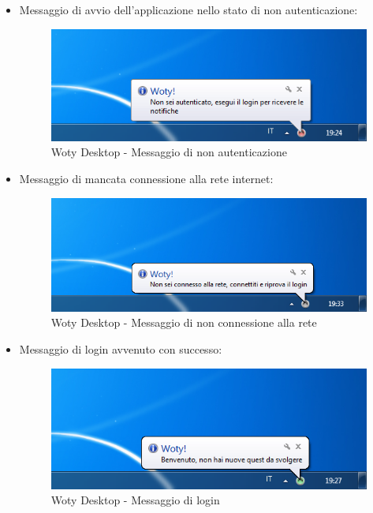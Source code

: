 \begin{itemize}
\item Messaggio di avvio dell'applicazione nello stato di non autenticazione:

\begin{center}
\begin{figure}[H]
\centering
\includegraphics[scale=0.64]{images/wotyDesktop/schreenshots/msg-start.png}
\caption{Woty Desktop - Messaggio di non autenticazione}
\label{wd}
\end{figure}
\end{center}

\item Messaggio di mancata connessione alla rete internet:

\begin{center}
\begin{figure}[H]
\centering
\includegraphics[scale=0.6]{images/wotyDesktop/schreenshots/msg-offline.png}
\caption{Woty Desktop - Messaggio di non connessione alla rete}
\label{wd}
\end{figure}
\end{center}


\item Messaggio di login avvenuto con successo: 

\begin{center}
\begin{figure}[H]
\centering
\includegraphics[scale=0.6]{images/wotyDesktop/schreenshots/msg-login.png}
\caption{Woty Desktop - Messaggio di login}
\label{wd}
\end{figure}
\end{center}



\end{itemize}
